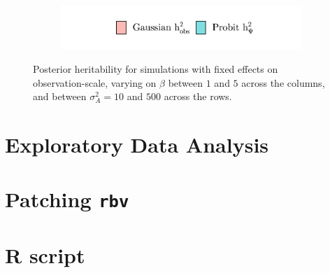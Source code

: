 \begin{figure}
\begin{subfigure}{0.49\textwidth}
    \end{subfigure}
    \begin{subfigure}{0.6\textwidth}
    \includegraphics[width=\textwidth]{figures/fixedeffects_gaussian_probit_legend.pdf}
    \end{subfigure}
    \caption[$h^2$ for fixed effects with varying $\beta$]{Posterior heritability for simulations with fixed effects on observation-scale, varying on $\beta$ between $1$ and $5$ across the columns, and between $\sigma^2_A=10$ and $500$ across the rows.}
    \label{fig:fixedeffects varying betas}
\end{figure}

\chapter{Exploratory Data Analysis}
\label{app:EDA}


\chapter{Patching \texttt{rbv}}
\label{app:rbv-patch}


\chapter{R script}
\label{app:Rmd script}
                                      